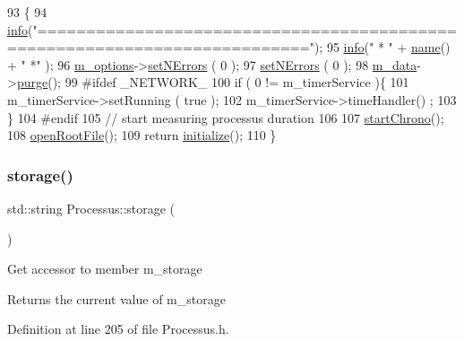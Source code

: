 \begin{DoxyCode}
93                                       \{
94   \hyperlink{classObject_a644fd329ea4cb85f54fa6846484b84a8}{info}(\textcolor{stringliteral}{"=========================================================================="});
95   \hyperlink{classObject_a644fd329ea4cb85f54fa6846484b84a8}{info}(\textcolor{stringliteral}{"   * "} + \hyperlink{classObject_a300f4c05dd468c7bb8b3c968868443c1}{name}() + \textcolor{stringliteral}{" *"} );
96   \hyperlink{classProcessus_a74205f3c1e00c4448f7b3257c2351797}{m\_options}->\hyperlink{classOptions_a45368b495036869c67fe0e6bf9abc4e6}{setNErrors} ( 0 );
97   \hyperlink{classProcessus_a831b027b9cf18ab56fa6147b5d3055da}{setNErrors} ( 0 );
98   \hyperlink{classProcessus_a3da9a9de8af54e2f47807a3e09dfccff}{m\_data}->\hyperlink{classData_a26209d56fdc86a72ae391fcd3bd2adfd}{purge}();
99 \textcolor{preprocessor}{#ifdef \_NETWORK\_}
100   \textcolor{keywordflow}{if} ( 0 != m\_timerService )\{
101     m\_timerService->setRunning ( \textcolor{keyword}{true} );
102     m\_timerService->timeHandler() ;
103   \}
104 \textcolor{preprocessor}{#endif}
105   \textcolor{comment}{// start measuring processus duration}
106   
107   \hyperlink{classProcessus_a5e4d34b86241fa0756e07375a14ff4b2}{startChrono}();
108   \hyperlink{classProcessus_aacf6812880c1d1a2bf14a4a39458f443}{openRootFile}();
109   \textcolor{keywordflow}{return} \hyperlink{classProcessus_aee88ad7b77ae7319cf8b128e9dd2ea11}{initialize}();
110 \}
\end{DoxyCode}
\mbox{\label{classProcessus_a33fa1a0b54a636e5cdd680669fd9ea51}} 
\subsubsection{\texorpdfstring{storage()}{storage()}}
{\footnotesize\ttfamily std\+::string Processus\+::storage (\begin{DoxyParamCaption}{ }\end{DoxyParamCaption})\hspace{0.3cm}{\ttfamily [inline]}}

Get accessor to member m\+\_\+storage \begin{DoxyReturn}{Returns}
the current value of m\+\_\+storage 
\end{DoxyReturn}


Definition at line 205 of file Processus.\+h.



